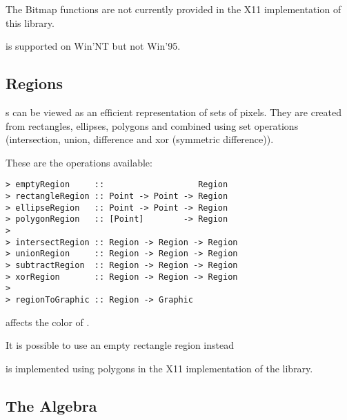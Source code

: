 
\begin{portability}
\item The Bitmap functions are not currently provided in the X11
implementation of this library.
\item {} is supported on Win'NT but not Win'95.
\end{portability}



\subsection{Regions}

s can be viewed as an efficient representation of sets of
pixels.  They are created from rectangles, ellipses, polygons and
combined using set operations (intersection, union, difference and xor
(symmetric difference)).

These are the operations available:
\begin{verbatim}
> emptyRegion     ::                   Region
> rectangleRegion :: Point -> Point -> Region
> ellipseRegion   :: Point -> Point -> Region
> polygonRegion   :: [Point]        -> Region
> 
> intersectRegion :: Region -> Region -> Region
> unionRegion     :: Region -> Region -> Region
> subtractRegion  :: Region -> Region -> Region
> xorRegion       :: Region -> Region -> Region
>                            
> regionToGraphic :: Region -> Graphic
\end{verbatim}

 affects the color of .

\begin{portability}
\item {}
It is possible to use an empty rectangle region instead
\item {} is implemented using polygons in the X11
implementation of the library.
\end{portability}


\subsection{The  Algebra}

